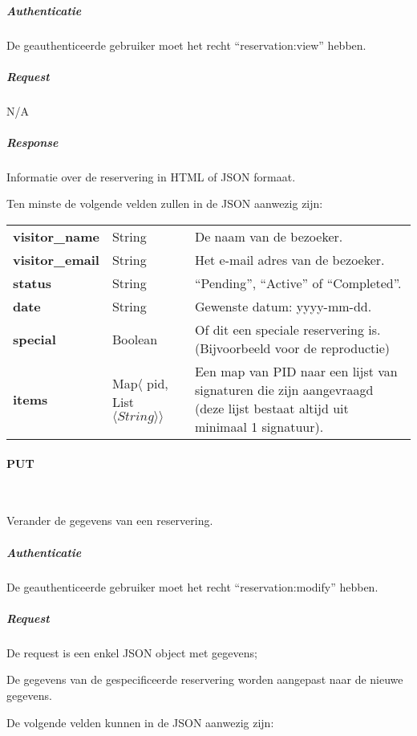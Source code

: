 \documentclass[a4paper,titlepage]{report}
\makeatletter
\def\namedlabel#1#2{
  \label{#1}
  \begingroup
   \def\@currentlabel{#2}%
   \label{#1:name}\endgroup
}
\makeatother
\begin{document}
          \subparagraph{Authenticatie}
            De geauthenticeerde gebruiker moet het recht ``reservation:view''
            hebben.

          \subparagraph{Request} N/A

          \subparagraph{Response}
            Informatie over de reservering in HTML of JSON formaat.

            Ten minste de volgende velden zullen in de JSON aanwezig zijn:\\

            \begin{tabular}{ l l p{10cm} }
              \textbf{visitor\_name} & String & De naam van de bezoeker. \\
              \textbf{visitor\_email} & String & Het e-mail adres van de bezoeker. \\
              \textbf{status} & String & ``Pending'', ``Active'' of ``Completed''. \\
              \textbf{date} & String & Gewenste datum: yyyy-mm-dd. \\
              \textbf{special} & Boolean & Of dit een speciale reservering is.
                (Bijvoorbeeld voor de reproductie)\\
              \textbf{items} & Map$\langle$ pid, List$\langle String
                \rangle\rangle$ & Een map van PID naar een lijst van signaturen
                die zijn aangevraagd (deze lijst bestaat altijd uit minimaal 1
                signatuur).\\
            \end{tabular}

        \paragraph{PUT}\hfill\\
          \namedlabel{api:reservation:put}{PUT /reservation/[id]}
          Verander de gegevens van een reservering.

          \subparagraph{Authenticatie}
            De geauthenticeerde gebruiker moet het recht ``reservation:modify''
            hebben.

          \subparagraph{Request}
            De request is een enkel JSON object met gegevens;

            De gegevens van de gespecificeerde reservering worden aangepast
            naar de nieuwe gegevens.

            De volgende velden kunnen in de JSON aanwezig zijn:\\
\end{document}
